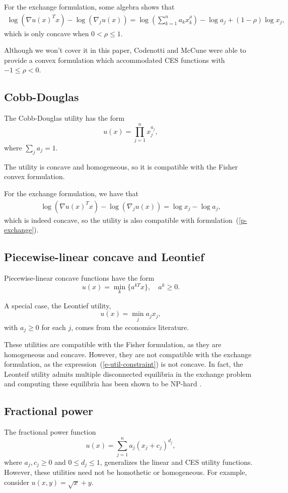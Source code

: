 \documentclass[12pt]{article}
\begin{document}
For the exchange formulation, some algebra shows that 
\begin{align*}
\log(\nabla u(x)^T x) - \log(\nabla_j u(x)) =
\log\left(\sum_{k=1}^n a_k x_k^\rho \right) - \log a_j + (1-\rho) \log x_j,
\end{align*}
which is only concave when $0 < \rho \leq 1$.

Although we won't cover it in this paper, Codenotti and McCune
\cite{codenotti2005marketCES} were able to provide a convex formulation which
accommodated CES functions with $-1 \leq \rho < 0$.

\subsection{Cobb-Douglas}
The Cobb-Douglas utility has the form
\[
u(x) = \prod_{j=1}^{n} x_j^{a_j},
\]
where $\sum_j a_j = 1$.


The utility is concave and homogeneous, so it is compatible with the Fisher
convex formulation.

For the exchange formulation, we have that
\begin{align*}
\log(\nabla u(x)^T x) - \log(\nabla_j u(x)) =
\log x_j - \log a_j,
\end{align*}
which is indeed concave, so the utility is also compatible with
formulation~(\ref{p-exchange}).

\subsection{Piecewise-linear concave and Leontief}
Piecewise-linear concave functions have the form
\[
u(x) = \min_k\lbrace a^{kT}x \rbrace,\quad a^k \geq 0.
\]

A special case, the Leontief utility,
\[
u(x) = \min_j a_j x_j,
\]
with $a_j \geq 0$ for each $j$,  comes from the economics literature. 

These utilities are compatible with the Fisher formulation, as they are
homogeneous and concave. However, they are not compatible with the exchange
formulation, as the expression~(\ref{e-util-constraint}) is not concave. In
fact, the Leonteif utility admits multiple disconnected equilibria in the
exchange problem and computing these equilibria has been shown to be NP-hard
\cite{codenotti2006leontief}.

\subsection{Fractional power}
The fractional power function
\[
u(x) = \sum_{j=1}^n a_j (x_j+ c_j)^{d_j},
\]
where $a_j, c_j \geq 0$ and $0 \leq d_j \leq 1$,
generalizes the linear and CES utility functions.
However, these utilities need not be homothetic or homogeneous.
For example, consider $u(x,y) = \sqrt{x} + y$.
\end{document}
